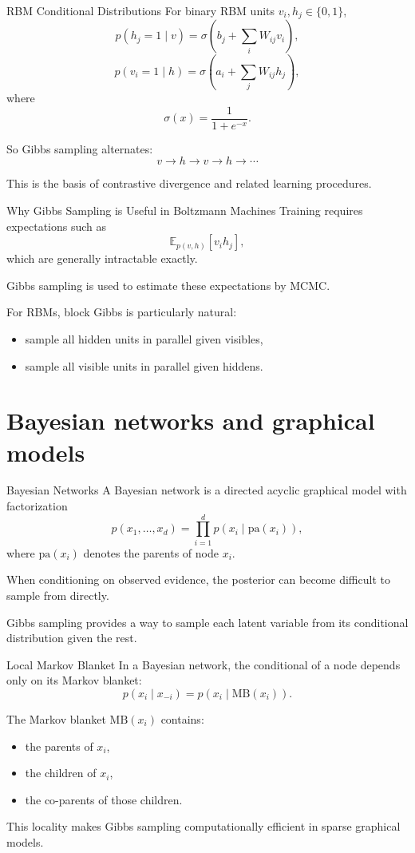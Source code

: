\documentclass[aspectratio=169]{beamer}
\begin{document}
\begin{frame}{RBM Conditional Distributions}
For binary RBM units \(v_i,h_j\in\{0,1\}\),
\[
p(h_j=1\mid v)=\sigma\left(b_j+\sum_i W_{ij}v_i\right),
\]
\[
p(v_i=1\mid h)=\sigma\left(a_i+\sum_j W_{ij}h_j\right),
\]
where
\[
\sigma(x)=\frac{1}{1+e^{-x}}.
\]

So Gibbs sampling alternates:
\[
v \to h \to v \to h \to \cdots
\]

This is the basis of contrastive divergence and related learning procedures.
\end{frame}

\begin{frame}{Why Gibbs Sampling is Useful in Boltzmann Machines}
Training requires expectations such as
\[
\mathbb{E}_{p(v,h)}[v_i h_j],
\]
which are generally intractable exactly.

Gibbs sampling is used to estimate these expectations by MCMC.

For RBMs, block Gibbs is particularly natural:
\begin{itemize}
    \item sample all hidden units in parallel given visibles,
    \item sample all visible units in parallel given hiddens.
\end{itemize}
\end{frame}

\section{Bayesian networks and graphical models}

\begin{frame}{Bayesian Networks}
A Bayesian network is a directed acyclic graphical model with factorization
\[
p(x_1,\dots,x_d)=\prod_{i=1}^d p(x_i\mid \mathrm{pa}(x_i)),
\]
where \(\mathrm{pa}(x_i)\) denotes the parents of node \(x_i\).

When conditioning on observed evidence, the posterior can become difficult to sample from directly.

Gibbs sampling provides a way to sample each latent variable from its conditional distribution given the rest.
\end{frame}

\begin{frame}{Local Markov Blanket}
In a Bayesian network, the conditional of a node depends only on its Markov blanket:
\[
p(x_i\mid x_{-i}) = p(x_i\mid \mathrm{MB}(x_i)).
\]

The Markov blanket \(\mathrm{MB}(x_i)\) contains:
\begin{itemize}
    \item the parents of \(x_i\),
    \item the children of \(x_i\),
    \item the co-parents of those children.
\end{itemize}

This locality makes Gibbs sampling computationally efficient in sparse graphical models.
\end{frame}
\end{document}
